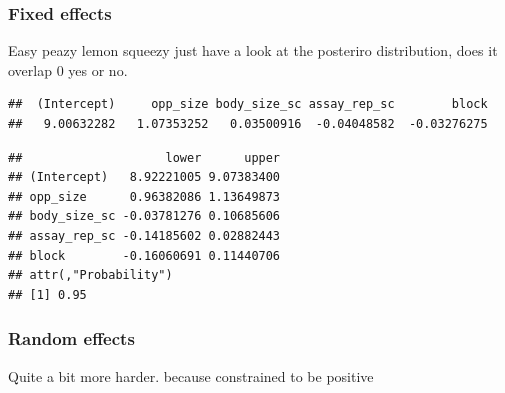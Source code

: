 \documentclass[
  12pt,
]{book}
\newenvironment{Shaded}{\begin{snugshade}}{\end{snugshade}}
\newcommand{\FunctionTok}[1]{\textcolor[rgb]{0.00,0.00,0.00}{#1}}
\newcommand{\NormalTok}[1]{#1}
\newcommand{\SpecialCharTok}[1]{\textcolor[rgb]{0.00,0.00,0.00}{#1}}
\begin{document}
\hypertarget{fixed-effects-2}{%
\subsubsection{Fixed effects}\label{fixed-effects-2}}

Easy peazy lemon squeezy just have a look at the posteriro distribution, does it overlap 0 yes or no.

\begin{Shaded}
\end{Shaded}

\begin{verbatim}
##  (Intercept)     opp_size body_size_sc assay_rep_sc        block 
##   9.00632282   1.07353252   0.03500916  -0.04048582  -0.03276275
\end{verbatim}

\begin{Shaded}
\end{Shaded}

\begin{verbatim}
##                    lower      upper
## (Intercept)   8.92221005 9.07383400
## opp_size      0.96382086 1.13649873
## body_size_sc -0.03781276 0.10685606
## assay_rep_sc -0.14185602 0.02882443
## block        -0.16060691 0.11440706
## attr(,"Probability")
## [1] 0.95
\end{verbatim}

\hypertarget{random-effects-2}{%
\subsubsection{Random effects}\label{random-effects-2}}

Quite a bit more harder. because constrained to be positive

\begin{Shaded}
\end{Shaded}
\end{document}
